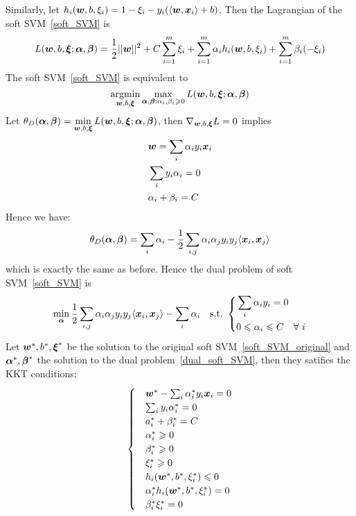 Similarly, let $h_i(\boldsymbol{w}, b, \xi_i) = 1 - \xi_i - y_i(\langle\boldsymbol{w}, \boldsymbol{x}_i\rangle + b)$. Then the Lagrangian
of the soft SVM~\eqref{soft_SVM} is
$$L(\boldsymbol{w}, b, \boldsymbol{\xi}; \boldsymbol{\alpha}, \boldsymbol{\beta}) = \frac{1}{2}||\boldsymbol{w}||^2 + C\sum_{i=1}^m \xi_i + \sum_{i=1}^m
\alpha_i h_i(\boldsymbol{w}, b, \xi_i) + \sum_{i=1}^m \beta_i (-\xi_i)$$
The soft SVM~\eqref{soft_SVM} is equivalent to
$$\operatorname*{argmin}_{\boldsymbol{w}, b, \boldsymbol{\xi}}\max_{\boldsymbol{\alpha}, \boldsymbol{\beta}: \alpha_i, \beta_i \geqslant 0}
L(\boldsymbol{w}, b, \boldsymbol{\xi}; \boldsymbol{\alpha}, \boldsymbol{\beta})$$
Let $\displaystyle\theta_D(\boldsymbol{\alpha}, \boldsymbol{\beta}) = \min_{\boldsymbol{w}, b, \boldsymbol{\xi}}L(\boldsymbol{w}, b, \boldsymbol{\xi}; \boldsymbol{\alpha}, 
\boldsymbol{\beta})$, then $\nabla_{\boldsymbol{w}, b, \boldsymbol{\xi}} L = 0$ implies
\begin{subequations}
    \begin{align}
    &\boldsymbol{w} = \sum_i \alpha_i y_i \boldsymbol{x}_i\label{sub:soft_w}\\
    &\sum_i y_i \alpha_i = 0\label{sub:soft_b}\\
    &\alpha_i + \beta_i = C\label{sub:soft_C}
    \end{align}
\end{subequations}
Hence we have:
\begin{equation}
    \theta_D(\boldsymbol{\alpha}, \boldsymbol{\beta}) =  \sum_i \alpha_i - \frac{1}{2}\sum_{i, j}\alpha_i\alpha_j y_i y_j\langle
    \boldsymbol{x}_i, \boldsymbol{x}_j\rangle
\end{equation}
which is exactly the same as before. Hence the dual problem of soft SVM~\eqref{soft_SVM} is
\begin{equation}\label{dual_soft_SVM}
    \min_{\boldsymbol{\alpha}} \frac{1}{2}\sum_{i,j} \alpha_i \alpha_j y_i y_j\langle \boldsymbol{x}_i, \boldsymbol{x}_j\rangle -
    \sum_i \alpha_i\quad\text{s.t.\ } \left\{
    \begin{aligned}
        &\sum_i \alpha_i y_i = 0\\
        &0 \leqslant \alpha_i \leqslant C \quad\forall~i
    \end{aligned}\right.
\end{equation}
Let $\boldsymbol{w}^*, b^*, \boldsymbol{\xi}^*$ be the solution to the original soft SVM~\eqref{soft_SVM_original} and 
$\boldsymbol{\alpha}^*, \boldsymbol{\beta}^*$ the solution to the dual problem~\eqref{dual_soft_SVM}, then they satifies the KKT
conditions:
\begin{equation}\label{KKT_soft_SVM}
    \begin{cases}
        &\boldsymbol{w}^* - \sum_i \alpha_i^* y_i \boldsymbol{x}_i = 0\\
        &\sum_i y_i \alpha_i^* = 0\\
        & a_i^* + \beta_i^* = C\\
        & \alpha_i^* \geqslant 0\\
        & \beta_i^* \geqslant 0\\
        & \xi_i^* \geqslant 0\\
        & h_i(\boldsymbol{w}^*, b^*, \xi_i^*) \leqslant 0\\
        & \alpha_i^* h_i(\boldsymbol{w}^*, b^*, \xi_i^*) = 0\\
        & \beta_i^* \xi_i^* = 0
    \end{cases}
\end{equation}
